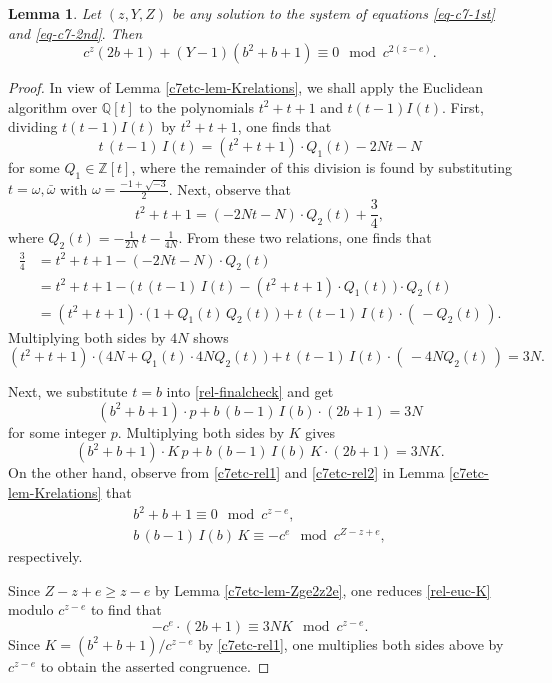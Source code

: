 \documentclass[11pt]{amsart}
\newtheorem{lem}{Lemma}[section]
\numberwithin{equation}{section}
\begin{document}
\begin{lem}\label{lem-c7etc-keycong}
Let $(z,Y,Z)$ be any solution to the system of equations \eqref{eq-c7-1st} and \eqref{eq-c7-2nd}$.$
Then 
\[
c^{z} (2b+1)+(Y-1)(b^2+b+1) \equiv 0 \mod{c^{2(z-e)}}.
\]
\end{lem}

\begin{proof}
In view of Lemma \ref{c7etc-lem-Krelations}, we shall apply the Euclidean algorithm over $\mathbb Q[t]$ to the polynomials $t^2+t+1$ and $t(t-1)I(t)$.
First, dividing $t(t-1)I(t)$ by $t^2+t+1$, one finds that
\[
t\,(t-1)\,I(t)=(t^2+t+1)\cdot Q_1(t)-2Nt-N
\]
for some $Q_1 \in \mathbb Z[t]$, where the remainder of this division is found by substituting $t=\omega,\bar{\omega}$ with $\omega=\frac{-1+\sqrt{-3}}{2}$.
Next, observe that
\[
t^2+t+1=(-2Nt-N)\cdot Q_2(t)+\frac{3}{4},
\]
where $Q_2(t)=-\frac{1}{2N}\,t-\frac{1}{4N}$.
From these two relations, one finds that
\begin{align*}
\frac{3}{4}
&=t^2+t+1-(-2Nt-N)\cdot Q_2(t)\\
&=t^2+t+1-\big(\, t\,(t-1)\,I(t)-(t^2+t+1)\cdot Q_1(t) \,\big)\cdot Q_2(t)\\
&=(t^2+t+1) \cdot \big(\,1+Q_1(t)\,Q_2(t)\,\big)
+t\,(t-1)\,I(t) \cdot (\,-Q_2(t)\,).
\end{align*}
Multiplying both sides by $4N$ shows
\begin{equation}\label{rel-finalcheck}
(t^2+t+1) \cdot \big(\,4N+Q_1(t)\cdot 4NQ_2(t)\,\big)+
t\,(t-1)\,I(t) \cdot (\,-4NQ_2(t)\,)=3N.
\end{equation}

Next, we substitute $t=b$ into \eqref{rel-finalcheck} and get
\begin{equation}\label{rel-euc}
(b^2+b+1) \cdot p+
b\,(b-1)\,I(b) \cdot (2b+1)=3N
\end{equation}
for some integer $p$.
Multiplying both sides by $K$ gives
\begin{equation}\label{rel-euc-K}
(b^2+b+1) \cdot K\,p+b\,(b-1)\,I(b)\,K \cdot (2b+1)=3NK.
\end{equation}
On the other hand, observe from \eqref{c7etc-rel1} and \eqref{c7etc-rel2} in Lemma \ref{c7etc-lem-Krelations} that
\begin{gather*}
b^2+b+1 \equiv 0 \mod{c^{z-e}}, \\
b\,(b-1)\,I(b)\,K \equiv -c^e \mod{c^{Z-z+e}},
\end{gather*}
respectively.

Since $Z-z+e \ge z-e$ by Lemma \ref{c7etc-lem-Zge2z2e}, one reduces \eqref{rel-euc-K} modulo $c^{z-e}$ to find that
\[
-c^e \cdot (2b+1) \equiv 3NK \mod{c^{z-e}}.
\]
Since $K=(b^2+b+1)/c^{z-e}$ by \eqref{c7etc-rel1}, one multiplies both sides above by $c^{z-e}$ to obtain the asserted congruence.
\end{proof}
\end{document}
